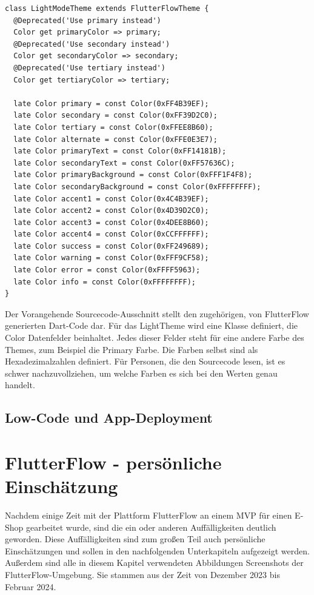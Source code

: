 \documentclass[acmtog, language=ngerman]{acmart}
\begin{document}
\begin{verbatim}
class LightModeTheme extends FlutterFlowTheme {
  @Deprecated('Use primary instead')
  Color get primaryColor => primary;
  @Deprecated('Use secondary instead')
  Color get secondaryColor => secondary;
  @Deprecated('Use tertiary instead')
  Color get tertiaryColor => tertiary;

  late Color primary = const Color(0xFF4B39EF);
  late Color secondary = const Color(0xFF39D2C0);
  late Color tertiary = const Color(0xFFEE8B60);
  late Color alternate = const Color(0xFFE0E3E7);
  late Color primaryText = const Color(0xFF14181B);
  late Color secondaryText = const Color(0xFF57636C);
  late Color primaryBackground = const Color(0xFFF1F4F8);
  late Color secondaryBackground = const Color(0xFFFFFFFF);
  late Color accent1 = const Color(0x4C4B39EF);
  late Color accent2 = const Color(0x4D39D2C0);
  late Color accent3 = const Color(0x4DEE8B60);
  late Color accent4 = const Color(0xCCFFFFFF);
  late Color success = const Color(0xFF249689);
  late Color warning = const Color(0xFFF9CF58);
  late Color error = const Color(0xFFFF5963);
  late Color info = const Color(0xFFFFFFFF);
}
\end{verbatim}


Der Vorangehende Sourcecode-Ausschnitt stellt den zugehörigen, von FlutterFlow generierten Dart-Code dar. Für das LightTheme wird eine Klasse definiert, die Color Datenfelder beinhaltet. Jedes dieser Felder steht für eine andere Farbe des Themes, zum Beispiel die Primary Farbe. Die Farben selbst sind als Hexadezimalzahlen definiert. Für Personen, die den Sourcecode lesen, ist es schwer nachzuvollziehen, um welche Farben es sich bei den Werten genau handelt.


\subsection{Low-Code und App-Deployment}


\section{FlutterFlow - persönliche Einschätzung}

Nachdem einige Zeit mit der Plattform FlutterFlow an einem MVP für einen E-Shop gearbeitet wurde, sind die ein oder anderen Auffälligkeiten deutlich geworden. Diese Auffälligkeiten sind zum großen Teil auch persönliche Einschätzungen und sollen in den nachfolgenden Unterkapiteln aufgezeigt werden.
Außerdem sind alle in diesem Kapitel verwendeten Abbildungen Screenshots der FlutterFlow-Umgebung. Sie stammen aus der Zeit von Dezember 2023 bis Februar 2024.
\end{document}
